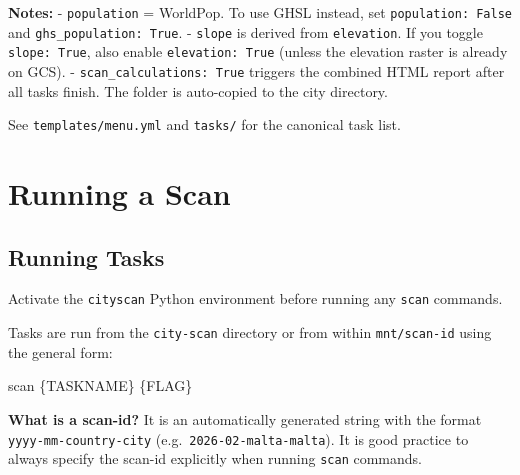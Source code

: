 \documentclass[
  letterpaper,
  DIV=11,
  numbers=noendperiod]{scrreprt}
\newenvironment{Shaded}{\begin{snugshade}}{\end{snugshade}}
\newcommand{\ExtensionTok}[1]{\textcolor[rgb]{0.00,0.23,0.31}{#1}}
\newcommand{\NormalTok}[1]{\textcolor[rgb]{0.00,0.23,0.31}{#1}}
\begin{document}
\textbf{Notes:} - \texttt{population} = WorldPop. To use GHSL instead,
set \texttt{population:\ False} and \texttt{ghs\_population:\ True}. -
\texttt{slope} is derived from \texttt{elevation}. If you toggle
\texttt{slope:\ True}, also enable \texttt{elevation:\ True} (unless the
elevation raster is already on GCS). -
\texttt{scan\_calculations:\ True} triggers the combined HTML report
after all tasks finish. The folder is auto-copied to the city directory.

See \texttt{templates/menu.yml} and \texttt{tasks/} for the canonical
task list.

\chapter{Running a Scan}\label{running-a-scan}

\section{Running Tasks}\label{running-tasks}

\begin{tcolorbox}[enhanced jigsaw, arc=.35mm, bottomrule=.15mm, bottomtitle=1mm, breakable, colback=white, colbacktitle=quarto-callout-note-color!10!white, colframe=quarto-callout-note-color-frame, coltitle=black, left=2mm, leftrule=.75mm, opacityback=0, opacitybacktitle=0.6, rightrule=.15mm, title=\textcolor{quarto-callout-note-color}{\faInfo}\hspace{0.5em}{Note}, titlerule=0mm, toprule=.15mm, toptitle=1mm]

Activate the \texttt{cityscan} Python environment before running any
\texttt{scan} commands.

\end{tcolorbox}

Tasks are run from the \texttt{city-scan} directory or from within
\texttt{mnt/scan-id} using the general form:

\begin{Shaded}
\begin{Highlighting}[]
\ExtensionTok{scan}\NormalTok{ \{TASKNAME\} \{FLAG\}}
\end{Highlighting}
\end{Shaded}

\begin{tcolorbox}[enhanced jigsaw, arc=.35mm, bottomrule=.15mm, bottomtitle=1mm, breakable, colback=white, colbacktitle=quarto-callout-note-color!10!white, colframe=quarto-callout-note-color-frame, coltitle=black, left=2mm, leftrule=.75mm, opacityback=0, opacitybacktitle=0.6, rightrule=.15mm, title=\textcolor{quarto-callout-note-color}{\faInfo}\hspace{0.5em}{Note}, titlerule=0mm, toprule=.15mm, toptitle=1mm]

\textbf{What is a scan-id?} It is an automatically generated string with
the format \texttt{yyyy-mm-country-city}
(e.g.~\texttt{2026-02-malta-malta}). It is good practice to always
specify the scan-id explicitly when running \texttt{scan} commands.

\end{tcolorbox}
\end{document}
